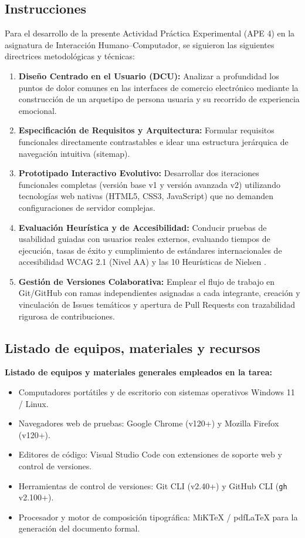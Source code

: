 \documentclass{article}
\begin{document}
\subsection{Instrucciones}
Para el desarrollo de la presente Actividad Práctica Experimental (APE 4) en la asignatura de Interacción Humano–Computador, se siguieron las siguientes directrices metodológicas y técnicas:
\begin{enumerate}
    \item \textbf{Diseño Centrado en el Usuario (DCU):} Analizar a profundidad los puntos de dolor comunes en las interfaces de comercio electrónico mediante la construcción de un arquetipo de persona usuaria y su recorrido de experiencia emocional.
    \item \textbf{Especificación de Requisitos y Arquitectura:} Formular requisitos funcionales directamente contrastables e idear una estructura jerárquica de navegación intuitiva (sitemap).
    \item \textbf{Prototipado Interactivo Evolutivo:} Desarrollar dos iteraciones funcionales completas (versión base v1 y versión avanzada v2) utilizando tecnologías web nativas (HTML5, CSS3, JavaScript) que no demanden configuraciones de servidor complejas.
    \item \textbf{Evaluación Heurística y de Accesibilidad:} Conducir pruebas de usabilidad guiadas con usuarios reales externos, evaluando tiempos de ejecución, tasas de éxito y cumplimiento de estándares internacionales de accesibilidad WCAG 2.1 (Nivel AA) y las 10 Heurísticas de Nielsen \cite{nielsen1994heuristics, w3c2023wcag}.
    \item \textbf{Gestión de Versiones Colaborativa:} Emplear el flujo de trabajo en Git/GitHub con ramas independientes asignadas a cada integrante, creación y vinculación de Issues temáticos y apertura de Pull Requests con trazabilidad rigurosa de contribuciones.
\end{enumerate}

\subsection{Listado de equipos, materiales y recursos}
\textbf{Listado de equipos y materiales generales empleados en la tarea:}
\begin{itemize}
    \item Computadores portátiles y de escritorio con sistemas operativos Windows 11 / Linux.
    \item Navegadores web de pruebas: Google Chrome (v120+) y Mozilla Firefox (v120+).
    \item Editores de código: Visual Studio Code con extensiones de soporte web y control de versiones.
    \item Herramientas de control de versiones: Git CLI (v2.40+) y GitHub CLI (\texttt{gh} v2.100+).
    \item Procesador y motor de composición tipográfica: MiKTeX / pdfLaTeX para la generación del documento formal.
\end{itemize}
\end{document}
